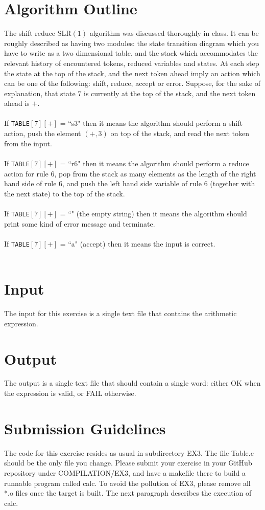 \documentclass{article}
\begin{document}
\section{Algorithm Outline}
The shift reduce SLR$(1)$ algorithm was discussed thoroughly in class.
It can be roughly described as having two modules:
the state transition diagram which you have to write as a two dimensional table,
and the stack which accommodates the relevant history of encountered tokens, reduced variables and states. At each step the state at the top of the stack, and the next token
ahead imply an action which can be one of the following: shift, reduce, accept or error.
Suppose, for the sake of explanation, that state $7$ is currently at the top of the stack, and the next token ahead is $+$. \\ \\
If \verb"TABLE"$[7][+]$ = ``s3" then it means the algorithm should
perform a shift action, push the element $(+,3)$ on top of the stack, and read the next token from the input.\\ \\
If \verb"TABLE"$[7][+]$ = ``r6" then it means the algorithm should
perform a reduce action for rule $6$, pop from the stack as many elements as
the length of the right hand side of rule $6$, and push the left hand side variable of rule $6$ (together with the next state) to the top of the stack.\\ \\
If \verb"TABLE"$[7][+]$ = ``" (the empty string) then it means the algorithm should
print some kind of error message and terminate.\\ \\
If \verb"TABLE"$[7][+]$ = ``a" (accept) then it means the input is correct.\\ \\

\section{Input}
The input for this exercise is a single text file that contains the arithmetic expression.

\section{Output}
The output is a single text file that should contain a single word:
either OK when the expression is valid, or FAIL otherwise. 

\section{Submission Guidelines}
The code for this exercise resides as usual in subdirectory EX3.
The file Table.c should be the only file you change.
Please submit your exercise in your GitHub repository under COMPILATION/EX3,
and have a makefile there to build a runnable program called calc.
To avoid the pollution of EX3, please remove all *.o files once the target is built.
The next paragraph describes the execution of calc.
\end{document}
